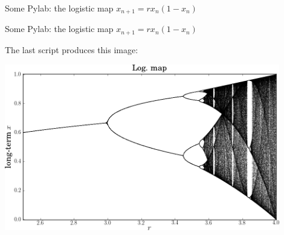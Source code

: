 \begin{frame}{Some Pylab: the logistic map $x_{n+1}= rx_n(1-x_n)$}

\end{frame}

\begin{frame}{Some Pylab: the logistic map $x_{n+1}= rx_n(1-x_n)$}

The last script produces this image:

\begin{center}
    \includegraphics[width=0.9\textwidth]{Figures/logMap}
\end{center}

\end{frame}

